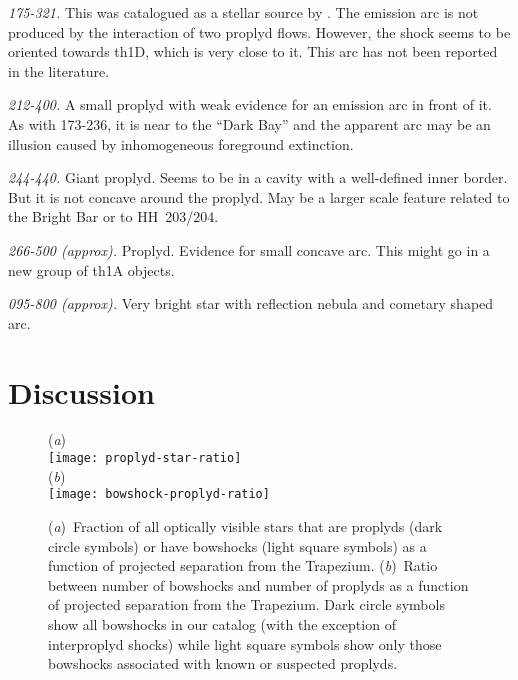 \documentclass[apj, twocolumn]{aastex63}
\renewcommand\clearpage{}
\begin{document}
\textit{175-321.} This was catalogued as a stellar source by \citet{ODell:1996a}.
The emission arc is not produced by the interaction of two proplyd flows. However,
the shock seems to be oriented towards th1D, which is very close to it. This arc
has not been reported in the literature.

\textit{212-400.}  A small proplyd with weak evidence for an emission
arc in front of it.  As with 173-236, it is near to the ``Dark Bay''
and the apparent arc may be an illusion caused by inhomogeneous
foreground extinction.

\textit{244-440.} Giant proplyd.  Seems to be in a cavity with a
well-defined inner border.  But it is not concave around the proplyd.
May be a larger scale feature related to the Bright Bar or to
HH~203/204.

\textit{266-500 (approx).} Proplyd. Evidence for small concave arc.
This might go in a new group of th1A objects.

\textit{095-800 (approx).} Very bright star with reflection nebula
and cometary shaped arc. 

\label{sec:problematic-group}



\label{sec:notshell}



\clearpage
\section{Discussion}
\label{sec:discuss}
\begin{figure}
  (\textit{a})\\
  \texttt{[image: proplyd-star-ratio]}\\
  (\textit{b})\\
  \texttt{[image: bowshock-proplyd-ratio]}
  \caption{(\textit{a})~Fraction of all optically visible stars that
    are proplyds (dark circle symbols) or have bowshocks (light square
    symbols) as a function of projected separation from the Trapezium.
    (\textit{b})~Ratio between number of bowshocks and number of
    proplyds as a function of projected separation from the Trapezium.
    Dark circle symbols show all bowshocks in our catalog (with the
    exception of interproplyd shocks) while light square symbols show
    only those bowshocks associated with known or suspected proplyds.
  }
  \label{fig:bow-proplyd-star-ratios}
\end{figure}
\end{document}
